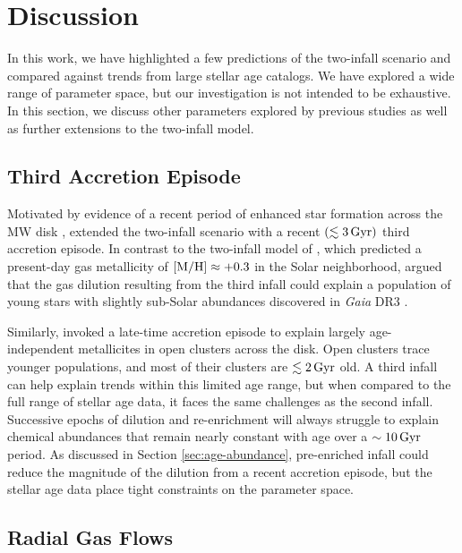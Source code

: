 \documentclass[twocolumn,twocolappendix,linenumbers]{aastex631}
\newcommand{\Gyr}{\,{\rm Gyr}}
\begin{document}
\section{Discussion}
\label{sec:discussion}

In this work, we have highlighted a few predictions of the two-infall scenario and compared against trends from large stellar age catalogs. We have explored a wide range of parameter space, but our investigation is not intended to be exhaustive. In this section, we discuss other parameters explored by previous studies as well as further extensions to the two-infall model.

\subsection{Third Accretion Episode}

Motivated by evidence of a recent period of enhanced star formation across the MW disk \citep{ruiz-lara_recurrent_2020}, \citet{spitoni_beyond_2023} extended the two-infall scenario with a recent $(\lesssim3\Gyr)$ third accretion episode. In contrast to the two-infall model of \citet{spitoni_apogee_2021}, which predicted a present-day gas metallicity of ${\rm [M/H]}\approx+0.3$ in the Solar neighborhood, \citet{spitoni_beyond_2023} argued that the gas dilution resulting from the third infall could explain a population of young stars with slightly sub-Solar abundances discovered in {\it Gaia} DR3 \citep{recio-blanco_gaia_2023}.

Similarly, \citet{palla_mapping_2024} invoked a late-time accretion episode to explain largely age-independent metallicites in open clusters across the disk. Open clusters trace younger populations, and most of their clusters are $\lesssim2\Gyr$ old. A third infall can help explain trends within this limited age range, but when compared to the full range of stellar age data, it faces the same challenges as the second infall. Successive epochs of dilution and re-enrichment will always struggle to explain chemical abundances that remain nearly constant with age over a $\sim10\Gyr$ period. As discussed in Section \ref{sec:age-abundance}, pre-enriched infall could reduce the magnitude of the dilution from a recent accretion episode, but the stellar age data place tight constraints on the parameter space.

\subsection{Radial Gas Flows}
\label{sec:radial-flows}
\end{document}
